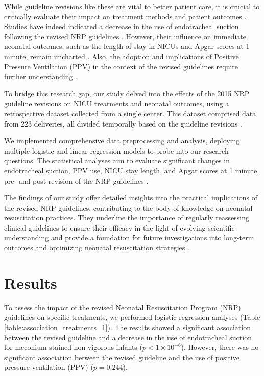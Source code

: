 \documentclass[11pt]{article}
\begin{document}
While guideline revisions like these are vital to better patient care, it is crucial to critically evaluate their impact on treatment methods and patient outcomes \cite{Dol2017TheIO}. Studies have indeed indicated a decrease in the use of endotracheal suction following the revised NRP guidelines \cite{Myers2020ImpactOT}. However, their influence on immediate neonatal outcomes, such as the length of stay in NICUs and Apgar scores at 1 minute, remain uncharted \cite{Acolet2011ImprovementIN}. Also, the adoption and implications of Positive Pressure Ventilation (PPV) in the context of the revised guidelines require further understanding \cite{Reynolds2009TheGH}.

To bridge this research gap, our study delved into the effects of the 2015 NRP guideline revisions on NICU treatments and neonatal outcomes, using a retrospective dataset collected from a single center. This dataset comprised data from 223 deliveries, all divided temporally based on the guideline revisions \cite{Stevenson2019DescriptorA}.

We implemented comprehensive data preprocessing and analysis, deploying multiple logistic and linear regression models to probe into our research questions. The statistical analyses aim to evaluate significant changes in endotracheal suction, PPV use, NICU stay length, and Apgar scores at 1 minute, pre- and post-revision of the NRP guidelines \cite{Baergen2001MorbidityMA}.

The findings of our study offer detailed insights into the practical implications of the revised NRP guidelines, contributing to the body of knowledge on neonatal resuscitation practices. They underline the importance of regularly reassessing clinical guidelines to ensure their efficacy in the light of evolving scientific understanding and provide a foundation for future investigations into long-term outcomes and optimizing neonatal resuscitation strategies \cite{Yu2020ClinicalFA}.

\section*{Results}

To assess the impact of the revised Neonatal Resuscitation Program (NRP) guidelines on specific treatments, we performed logistic regression analyses (Table {}\ref{table:association_treatments_1}). The results showed a significant association between the revised guideline and a decrease in the use of endotracheal suction for meconium-stained non-vigorous infants ($p < 1 \times 10^{-6}$). However, there was no significant association between the revised guideline and the use of positive pressure ventilation (PPV) ($p = 0.244$).
\end{document}
